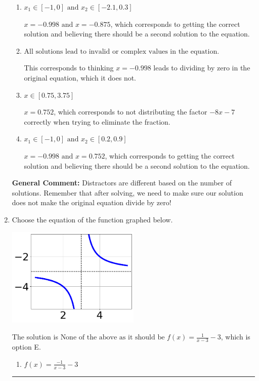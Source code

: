 \documentclass{extbook}[14pt]
\newcommand{\litem}[1]{\item #1

\rule{\textwidth}{0.4pt}}
\begin{document}
\begin{enumerate}
{\begin{enumerate}[label=\Alph*.]
* $x = -0.998$, which is the correct option.
\item \( x_1 \in [-1, 0] \text{ and } x_2 \in [-2.1,0.3] \)

$x = -0.998 \text{ and } x = -0.875$, which corresponds to getting the correct solution and believing there should be a second solution to the equation.
\item \( \text{All solutions lead to invalid or complex values in the equation.} \)

This corresponds to thinking $x = -0.998$ leads to dividing by zero in the original equation, which it does not.
\item \( x \in [0.75,3.75] \)

$x = 0.752$, which corresponds to not distributing the factor $-8x -7$ correctly when trying to eliminate the fraction.
\item \( x_1 \in [-1, 0] \text{ and } x_2 \in [0.2,0.9] \)

$x = -0.998 \text{ and } x = 0.752$, which corresponds to getting the correct solution and believing there should be a second solution to the equation.
\end{enumerate}

\textbf{General Comment:} Distractors are different based on the number of solutions. Remember that after solving, we need to make sure our solution does not make the original equation divide by zero!
}
\litem{
Choose the equation of the function graphed below.

\begin{center}
    \includegraphics[width=0.5\textwidth]{../Figures/rationalGraphToEquationCopyC.png}
\end{center}




The solution is \( \text{None of the above as it should be } f(x) = \frac{1}{x - 3} - 3 \), which is option E.\begin{enumerate}[label=\Alph*.]
\item \( f(x) = \frac{-1}{x - 3} - 3 \)


\end{enumerate}}
\end{enumerate}
\end{document}

